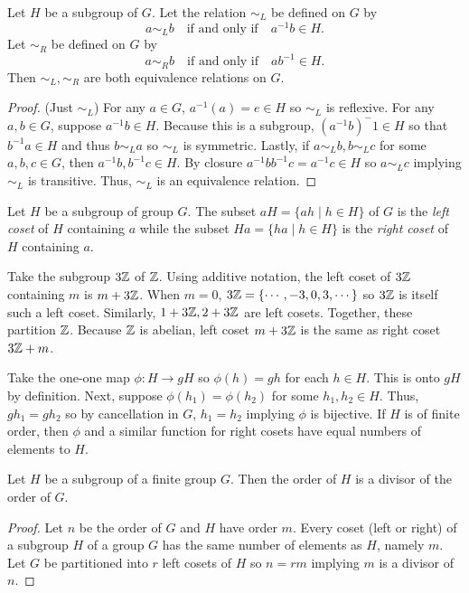 \begin{theorem}
    Let $H$ be a subgroup of $G$. Let the relation $\sim_L$ be defined on $G$ by $$a \sim_L b \quad\text{if and only if}\quad a^{-1}b\in H.$$ Let $\sim_R$ be defined on $G$ by $$a \sim_R b \quad\text{if and only if}\quad ab^{-1}\in H.$$ Then $\sim_L, \sim_R$ are both equivalence relations on $G$.
\end{theorem}
\begin{proof}(Just $\sim_L$) For any $a \in G$, $a^{-1}(a) = e \in H$ so $\sim_L$ is reflexive. For any $a, b\in G$, suppose $a^{-1}b \in H$. Because this is a subgroup, $(a^{-1}b)^-1 \in H$ so that $b^{-1}a \in H$ and thus $b \sim_L a$ so $\sim_L$ is symmetric. Lastly, if $a\sim_L b, b \sim_L c$ for some $a,b,c \in G$, then $a^{-1}b, b^{-1}c \in H$. By closure $a^{-1}bb^{-1}c = a^{-1}c \in H$ so $a \sim_L c$ implying $\sim_L$ is transitive. Thus, $\sim_L$ is an equivalence relation.
\end{proof}
\begin{definition}
    Let $H$ be a subgroup of group $G$. The subset $aH = \{ah \mid h \in H\}$ of $G$ is the \emph{left coset} of $H$ containing $a$ while the subset $Ha = \{ha \mid h \in H\}$ is the \emph{right coset} of $H$ containing $a$.
\end{definition}
\begin{example}
    Take the subgroup $3\mathbb{Z}$ of $\mathbb{Z}$. Using additive notation, the left coset of $3\mathbb{Z}$ containing $m$ is $m + 3\mathbb{Z}$. When $m=0$, $3\mathbb{Z} = \{\cdots, -3, 0, 3, \cdots\}$ so $3\mathbb{Z}$ is itself such a left coset. Similarly, $1 + 3\mathbb{Z}, 2+3\mathbb{Z}$ are left cosets. Together, these partition $\mathbb{Z}$. Because $\mathbb{Z}$ is abelian, left coset $m+3\mathbb{Z}$ is the same as right coset $3\mathbb{Z} + m$.
\end{example}
\begin{lemma}
    Take the one-one map $\phi\colon H \to gH$ so $\phi(h) = gh$ for each $h \in H$. This is onto $gH$ by definition. Next, suppose $\phi(h_1)=\phi(h_2)$ for some $h_1, h_2 \in H$. Thus, $gh_1 = gh_2$ so by cancellation in $G$, $h_1 = h_2$ implying $\phi$ is bijective. If $H$ is of finite order, then $\phi$ and a similar function for right cosets have equal numbers of elements to $H$.
\end{lemma}
\begin{theorem}
    Let $H$ be a subgroup of a finite group $G$. Then the order of $H$ is a divisor of the order of $G$.
\end{theorem}
\begin{proof}
    Let $n$ be the order of $G$ and $H$ have order $m$. Every coset (left or right) of a subgroup $H$ of a group $G$ has the same number of elements as $H$, namely $m$. Let $G$ be partitioned into $r$ left cosets of $H$ so $n=rm$ implying $m$ is a divisor of $n$.
\end{proof}
